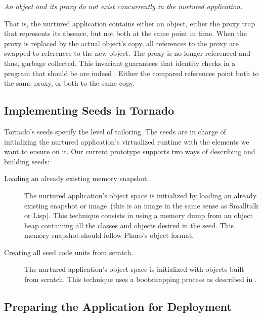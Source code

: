\begin{center}\emph{An object and its proxy do not exist concurrently in the nurtured application.}\end{center}

That is, the nurtured application contains either an object, either the proxy trap that represents its absence, but not both at the same point in time. When the proxy is replaced by the actual object's copy, all references to the proxy are swapped to references to the new object. The proxy is no longer referenced and thus, garbage collected. This invariant guarantees that identity checks in a program that should be  are indeed . Either the compared references point both to the same proxy, or both to the same copy.

\subsection{Implementing Seeds in Tornado}

Tornado's seeds specify the level of tailoring. The seeds are in charge of initializing the nurtured application's virtualized runtime with the elements we want to ensure on it. Our current prototype supports two ways of describing and building seeds: 

\begin{description}
\item[Loading an already existing memory snapshot.] The nurtured application's object space is initialized by loading an already existing snapshot or image~(\ie this is an image in the same sense as Smalltalk or Lisp). This technique consists in using a memory dump from an object heap containing all the classes and objects desired in the seed. This memory snapshot should follow Pharo's object format. 
\item[Creating all seed code units from scratch.] The nurtured application's object space is initialized with objects built from scratch. This technique uses a bootstrapping process as described in .
\end{description}


\subsection{Preparing the Application for Deployment}\label{sec:deploy}

